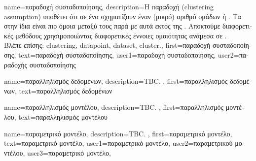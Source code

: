 {name={\foreignlanguage{greek}{παραδοχή συσταδοποίησης}}, 
	description={\foreignlanguage{greek}{Η παραδοχή} 
		 (clustering assumption) \foreignlanguage{greek}{υποθέτει ότι}  
		\foreignlanguage{greek}{σε ένα}  \foreignlanguage{greek}{σχηματίζουν έναν (μικρό) αριθμό ομάδων ή} 
		. \foreignlanguage{greek}{Τα}  \foreignlanguage{greek}{στην ίδια}  
		\foreignlanguage{greek}{είναι πιο όμοια μεταξύ τους παρά με αυτά εκτός της}  
		\cite{SemiSupervisedBook}. \foreignlanguage{greek}{Αποκτούμε διαφορετικές μεθόδους}  
		\foreignlanguage{greek}{χρησιμοποιώντας διαφορετικές έννοιες ομοιότητας ανάμεσα σε} .
		\\
		\foreignlanguage{greek}{Βλέπε επίσης:} \gls{clustering}, \gls{datapoint}, \gls{dataset}, \gls{cluster}.},
	first={\foreignlanguage{greek}{παραδοχή συσταδοποίησης}},
	text={\foreignlanguage{greek}{παραδοχή συσταδοποίησης}},
	user1={\foreignlanguage{greek}{παραδοχή συσταδοποίησης}}, %
	user2={\foreignlanguage{greek}{παραδοχής συσταδοποίησης}} %
}

{name={\foreignlanguage{greek}{παραλληλισμός δεδομένων}},
	description={TBC. },
 	first={\foreignlanguage{greek}{παραλληλισμός δεδομένων}},
 	text={\foreignlanguage{greek}{παραλληλισμός δεδομένων}}
}

{name={\foreignlanguage{greek}{παραλληλισμός μοντέλου}},
	description={TBC. },
	first={\foreignlanguage{greek}{παραλληλισμός μοντέλου}},
 	text={\foreignlanguage{greek}{παραλληλισμός μοντέλου}}
}

{name={\foreignlanguage{greek}{παραμετρικό μοντέλο}},
	description={TBC. },
	first={\foreignlanguage{greek}{παραμετρικό μοντέλο}},
	text={\foreignlanguage{greek}{παραμετρικό μοντέλο}},
	user1={\foreignlanguage{greek}{παραμετρικό μοντέλο}}, %
	user2={\foreignlanguage{greek}{παραμετρικού μοντέλου}}, %
	user3={\foreignlanguage{greek}{παραμετρικό μοντέλο}}, %
}

